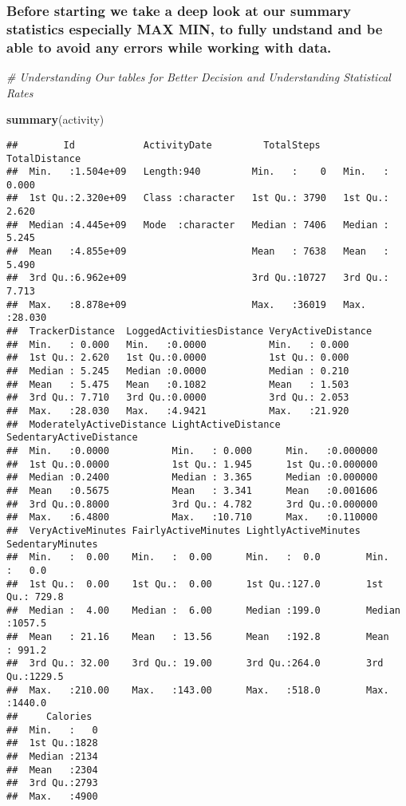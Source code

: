\documentclass[
]{article}
\newenvironment{Shaded}{\begin{snugshade}}{\end{snugshade}}
\newcommand{\CommentTok}[1]{\textcolor[rgb]{0.56,0.35,0.01}{\textit{#1}}}
\newcommand{\FunctionTok}[1]{\textcolor[rgb]{0.13,0.29,0.53}{\textbf{#1}}}
\newcommand{\NormalTok}[1]{#1}
\begin{document}
\subsubsection{Before starting we take a deep look at our summary
statistics especially MAX MIN, to fully undstand and be able to avoid
any errors while working with
data.}\label{before-starting-we-take-a-deep-look-at-our-summary-statistics-especially-max-min-to-fully-undstand-and-be-able-to-avoid-any-errors-while-working-with-data.}

\begin{Shaded}
\begin{Highlighting}[]
\CommentTok{\# Understanding Our tables for Better Decision and Understanding Statistical Rates}

\FunctionTok{summary}\NormalTok{(activity)}
\end{Highlighting}
\end{Shaded}

\begin{verbatim}
##        Id            ActivityDate         TotalSteps    TotalDistance   
##  Min.   :1.504e+09   Length:940         Min.   :    0   Min.   : 0.000  
##  1st Qu.:2.320e+09   Class :character   1st Qu.: 3790   1st Qu.: 2.620  
##  Median :4.445e+09   Mode  :character   Median : 7406   Median : 5.245  
##  Mean   :4.855e+09                      Mean   : 7638   Mean   : 5.490  
##  3rd Qu.:6.962e+09                      3rd Qu.:10727   3rd Qu.: 7.713  
##  Max.   :8.878e+09                      Max.   :36019   Max.   :28.030  
##  TrackerDistance  LoggedActivitiesDistance VeryActiveDistance
##  Min.   : 0.000   Min.   :0.0000           Min.   : 0.000    
##  1st Qu.: 2.620   1st Qu.:0.0000           1st Qu.: 0.000    
##  Median : 5.245   Median :0.0000           Median : 0.210    
##  Mean   : 5.475   Mean   :0.1082           Mean   : 1.503    
##  3rd Qu.: 7.710   3rd Qu.:0.0000           3rd Qu.: 2.053    
##  Max.   :28.030   Max.   :4.9421           Max.   :21.920    
##  ModeratelyActiveDistance LightActiveDistance SedentaryActiveDistance
##  Min.   :0.0000           Min.   : 0.000      Min.   :0.000000       
##  1st Qu.:0.0000           1st Qu.: 1.945      1st Qu.:0.000000       
##  Median :0.2400           Median : 3.365      Median :0.000000       
##  Mean   :0.5675           Mean   : 3.341      Mean   :0.001606       
##  3rd Qu.:0.8000           3rd Qu.: 4.782      3rd Qu.:0.000000       
##  Max.   :6.4800           Max.   :10.710      Max.   :0.110000       
##  VeryActiveMinutes FairlyActiveMinutes LightlyActiveMinutes SedentaryMinutes
##  Min.   :  0.00    Min.   :  0.00      Min.   :  0.0        Min.   :   0.0  
##  1st Qu.:  0.00    1st Qu.:  0.00      1st Qu.:127.0        1st Qu.: 729.8  
##  Median :  4.00    Median :  6.00      Median :199.0        Median :1057.5  
##  Mean   : 21.16    Mean   : 13.56      Mean   :192.8        Mean   : 991.2  
##  3rd Qu.: 32.00    3rd Qu.: 19.00      3rd Qu.:264.0        3rd Qu.:1229.5  
##  Max.   :210.00    Max.   :143.00      Max.   :518.0        Max.   :1440.0  
##     Calories   
##  Min.   :   0  
##  1st Qu.:1828  
##  Median :2134  
##  Mean   :2304  
##  3rd Qu.:2793  
##  Max.   :4900
\end{verbatim}
\end{document}

